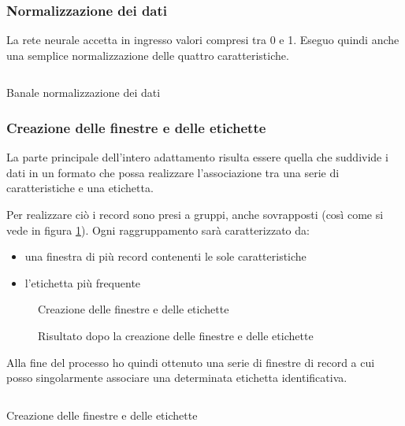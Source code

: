 \subsubsection{Normalizzazione dei dati}
La rete neurale accetta in ingresso valori compresi tra 0 e 1. Eseguo quindi anche una semplice normalizzazione delle quattro caratteristiche.
\begin{listing}[H] 
    \inputminted[frame=single,framesep=10pt]{python}{assets/snippets/classifier/normalize_data.py}
    \caption{Banale normalizzazione dei dati}
\end{listing}

\newpage
\subsubsection{Creazione delle finestre e delle etichette}
La parte principale dell'intero adattamento risulta essere quella che suddivide i dati in un formato che possa 
realizzare l'associazione tra una serie di caratteristiche e una etichetta.

Per realizzare ciò i record sono presi a gruppi, anche sovrapposti (così come si vede in figura \ref{fig:create_segments_and_labels}). 
Ogni raggruppamento sarà caratterizzato da: 
\begin{itemize}
    \item una finestra di più record contenenti le sole caratteristiche
    \item l'etichetta più frequente
\end{itemize}

\vfill
\begin{figure}[H]
  \centering
  
  \caption{Creazione delle finestre e delle etichette}
  \label{fig:create_segments_and_labels}
\end{figure}
\begin{figure}[H]
  \centering
  
  \caption{Risultato dopo la creazione delle finestre e delle etichette}
  \label{fig:segments_and_labels}
\end{figure}

Alla fine del processo ho quindi ottenuto una serie di finestre di record a cui posso singolarmente associare una determinata
etichetta identificativa.

\vfill
\begin{listing}[H] 
    \inputminted[frame=single,framesep=10pt]{python}{assets/snippets/classifier/create_segments_and_labels.py}
    \caption{Creazione delle finestre e delle etichette}
\end{listing}

